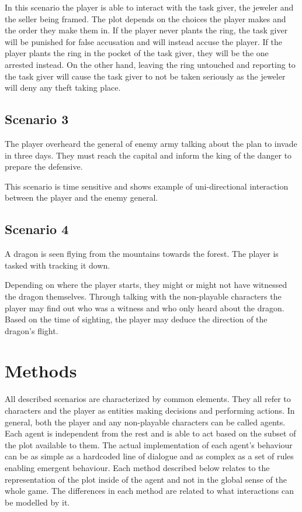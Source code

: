 In this scenario the player is able to interact with the task giver, the jeweler and the seller being framed.
The plot depends on the choices the player makes and the order they make them in.
If the player never plants the ring, the task giver will be punished for false accusation and will instead accuse the player.
If the player plants the ring in the pocket of the task giver, they will be the one arrested instead.
On the other hand, leaving the ring untouched and reporting to the task giver will cause the task giver to not be taken seriously as the jeweler will deny any theft taking place.

\subsection{Scenario 3}

The player overheard the general of enemy army talking about the plan to invade in three days.
They must reach the capital and inform the king of the danger to prepare the defensive.

This scenario is time sensitive and shows example of uni-directional interaction between the player and the enemy general.

\subsection{Scenario 4}

A dragon is seen flying from the mountains towards the forest.
The player is tasked with tracking it down.

Depending on where the player starts, they might or might not have witnessed the dragon themselves.
Through talking with the non-playable characters the player may find out who was a witness and who only heard about the dragon.
Based on the time of sighting, the player may deduce the direction of the dragon's flight.


\section{Methods}

All described scenarios are characterized by common elements.
They all refer to characters and the player as entities making decisions and performing actions.
In general, both the player and any non-playable characters can be called agents.
Each agent is independent from the rest and is able to act based on the subset of the plot available to them.
The actual implementation of each agent's behaviour can be as simple as a hardcoded line of dialogue and as complex as a set of rules enabling emergent behaviour.
Each method described below relates to the representation of the plot inside of the agent and not in the global sense of the whole game.
The differences in each method are related to what interactions can be modelled by it.

